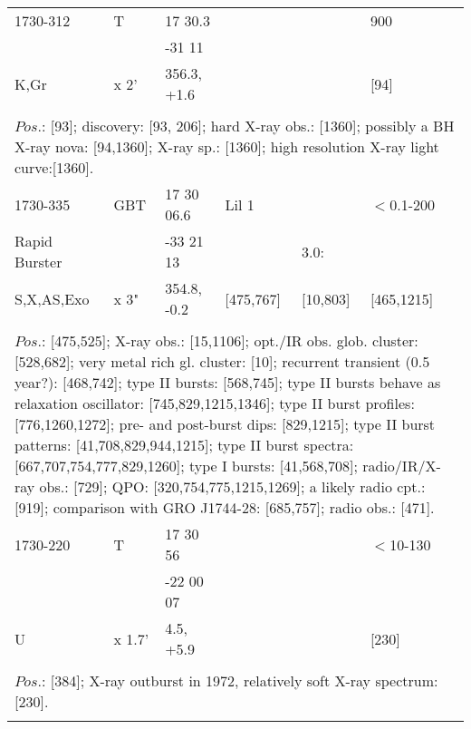 \documentclass{aa}
\begin{document}
\begin{tabular}{p{2.5cm}p{1cm}p{1.8cm}p{2.3cm}p{3.3cm}p{2.0cm}p{2.2cm}}
\noalign{\smallskip}
1730-312        & T            & 17 30.3             &               &                        & 900               &      \\
                         &                & -31 11              &               &                         &                       &    \\
K,Gr                & x 2'          & 356.3, +1.6      &               &                        & [94]                &    \\
\\
\multicolumn{7}{p{17.5cm}}{
$Pos$.: [93]; discovery: [93, 206]; hard X-ray obs.: [1360]; possibly a BH X-ray nova: [94,1360]; X-ray sp.: [1360]; high 
resolution X-ray light curve:[1360].}\\
\noalign{\smallskip}
\hline

\noalign{\smallskip}
1730-335              & GBT         & 17 30 06.6          & Lil 1            &                          & $<$0.1-200  &       \\
Rapid Burster   &                   & -33 21 13           &                      &  3.0:                 &                        &      \\
S,X,AS,Exo         & x 3"           & 354.8, -0.2         & [475,767]    & [10,803]          & [465,1215]    &       \\
\\
\multicolumn{7}{p{17.5cm}}{
$Pos$.: [475,525]; X-ray obs.: [15,1106]; opt./IR obs. glob. cluster: [528,682]; very metal rich gl. cluster: [10]; recurrent 
transient (0.5 year?): [468,742]; type II bursts: [568,745]; type II bursts behave as relaxation oscillator: 
[745,829,1215,1346]; type II burst profiles: [776,1260,1272]; pre- and post-burst dips: [829,1215]; type II burst patterns: 
[41,708,829,944,1215]; type II burst spectra: [667,707,754,777,829,1260]; type I bursts: [41,568,708]; radio/IR/X-ray 
obs.: [729]; QPO: [320,754,775,1215,1269]; a likely radio cpt.: [919]; comparison with GRO J1744-28: [685,757]; 
radio obs.: [471].}\\
\noalign{\smallskip}
\hline

\noalign{\smallskip}
1730-220        & T            & 17 30 56          &                   &                           & $<$10-130      &         \\
                         &                & -22 00 07        &                   &                           &                          &         \\
U                      & x 1.7'     & 4.5, +5.9          &                   &                           & [230]                &         \\
\\
\multicolumn{7}{p{17.5cm}}{
$Pos$.: [384]; X-ray outburst in 1972, relatively soft X-ray spectrum: [230].}\\
\noalign{\smallskip}
\hline


\end{tabular}
\end{document}

